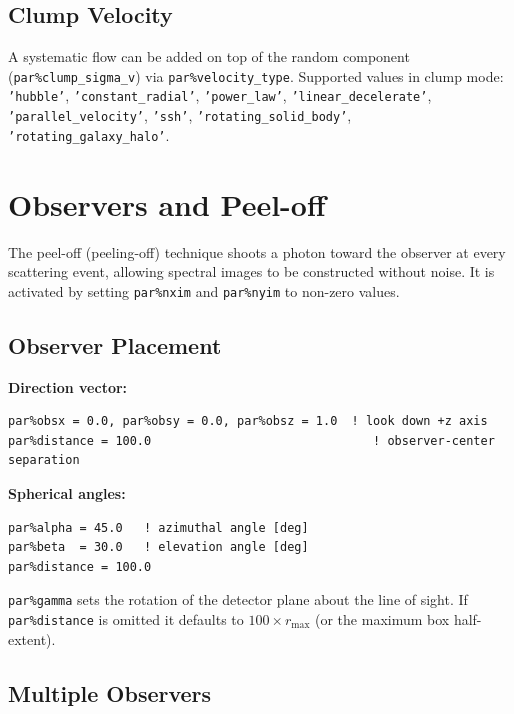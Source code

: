 \documentclass[english,a4paper]{my_memo}
\newcommand{\parm}[1]{\texttt{par\%#1}}
\begin{document}
\subsection{Clump Velocity}

\begin{sloppypar}
A systematic flow can be added on top of the random component (\parm{clump\_sigma\_v})
via \parm{velocity\_type}.  Supported values in clump mode: \texttt{'hubble'},
\texttt{'constant\_radial'}, \texttt{'power\_law'}, \texttt{'linear\_decelerate'},
\texttt{'parallel\_velocity'}, \texttt{'ssh'},
\texttt{'rotating\_solid\_body'}, \texttt{'rotating\_galaxy\_halo'}.
\end{sloppypar}

\section{Observers and Peel-off}
\label{sec:observer}

The peel-off (peeling-off) technique shoots a photon toward the observer at every
scattering event, allowing spectral images to be constructed without noise.  It is
activated by setting \parm{nxim} and \parm{nyim} to non-zero values.

\subsection{Observer Placement}

\textbf{Direction vector:}
\begin{lstlisting}
par%obsx = 0.0, par%obsy = 0.0, par%obsz = 1.0  ! look down +z axis
par%distance = 100.0                               ! observer-center separation
\end{lstlisting}

\textbf{Spherical angles:}
\begin{lstlisting}
par%alpha = 45.0   ! azimuthal angle [deg]
par%beta  = 30.0   ! elevation angle [deg]
par%distance = 100.0
\end{lstlisting}

\parm{gamma} sets the rotation of the detector plane about the line of sight.
If \parm{distance} is omitted it defaults to $100 \times r_\text{max}$ (or the maximum
box half-extent).

\subsection{Multiple Observers}
\end{document}
